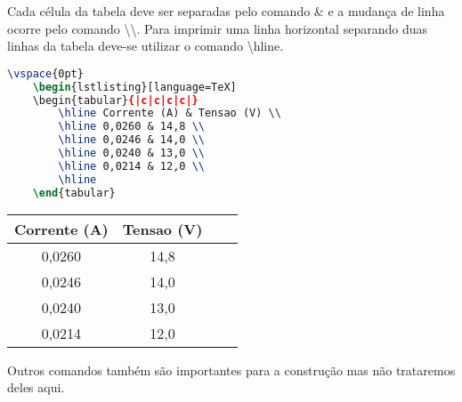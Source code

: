Cada célula da tabela deve ser separadas pelo comando \& e a mudança de linha ocorre pelo comando \textbackslash\textbackslash. Para imprimir uma linha horizontal separando duas linhas da tabela deve-se utilizar o comando \textbackslash\textsf{hline}.\\
\begin{minipage}[t]{0.47\linewidth}
    \vspace{-8pt}
    \begin{lstlisting}[language=TeX]
    \vspace{0pt}
    \begin{lstlisting}[language=TeX]
    \begin{tabular}{|c|c|c|c|}
        \hline Corrente (A) & Tensao (V) \\ 
        \hline 0,0260 & 14,8 \\
        \hline 0,0246 & 14,0 \\
        \hline 0,0240 & 13,0 \\
        \hline 0,0214 & 12,0 \\
        \hline 
    \end{tabular}
    \end{lstlisting}
\end{minipage} \hfill
\begin{minipage}[t]{0.47\linewidth}
    \vspace{0pt}
    \begin{tabular}{|c|c|c|c|}
        \hline Corrente (A) & Tensao (V) \\ 
        \hline 0,0260 & 14,8 \\
        \hline 0,0246 & 14,0 \\
        \hline 0,0240 & 13,0 \\
        \hline 0,0214 & 12,0 \\
        \hline 
    \end{tabular} 
\end{minipage} 

Outros comandos também são importantes para a construção mas não trataremos deles aqui.

